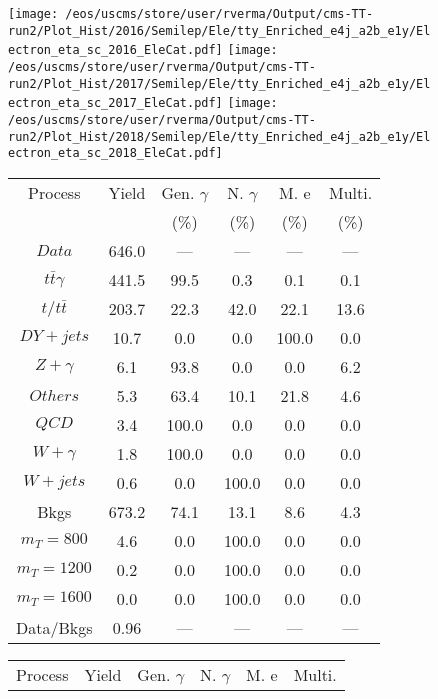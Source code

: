 \begin{figure}
\centering
\texttt{[image: /eos/uscms/store/user/rverma/Output/cms-TT-run2/Plot\_Hist/2016/Semilep/Ele/tty\_Enriched\_e4j\_a2b\_e1y/Electron\_eta\_sc\_2016\_EleCat.pdf]}
\texttt{[image: /eos/uscms/store/user/rverma/Output/cms-TT-run2/Plot\_Hist/2017/Semilep/Ele/tty\_Enriched\_e4j\_a2b\_e1y/Electron\_eta\_sc\_2017\_EleCat.pdf]}
\texttt{[image: /eos/uscms/store/user/rverma/Output/cms-TT-run2/Plot\_Hist/2018/Semilep/Ele/tty\_Enriched\_e4j\_a2b\_e1y/Electron\_eta\_sc\_2018\_EleCat.pdf]}
\begin{minipage}[c]{0.32\textwidth}
\centering
\tiny{
\begin{tabular}{cccccc}
\hline
Process & Yield & Gen. $\gamma$ & N. $\gamma$ & M. e & Multi. \\
 &  & (\%) & (\%) & (\%) & (\%)  \\
\hline
                                                                      $ Data $ &  646.0 &  --- &  --- &  --- &  ---\\
$ t\bar{t}\gamma $ &  441.5 &  99.5 &  0.3 &  0.1 &  0.1\\
$ t/t\bar{t} $ &  203.7 &  22.3 &  42.0 &  22.1 &  13.6\\
$ DY+jets $ &  10.7 &  0.0 &  0.0 &  100.0 &  0.0\\
$ Z+\gamma $ &  6.1 &  93.8 &  0.0 &  0.0 &  6.2\\
$ Others $ &  5.3 &  63.4 &  10.1 &  21.8 &  4.6\\
$ QCD $ &  3.4 &  100.0 &  0.0 &  0.0 &  0.0\\
$ W+\gamma $ &  1.8 &  100.0 &  0.0 &  0.0 &  0.0\\
$ W+jets $ &  0.6 &  0.0 &  100.0 &  0.0 &  0.0\\
Bkgs &  673.2 &  74.1 &  13.1 &  8.6 &  4.3\\
$ m_{T} = 800 $ &  4.6 &  0.0 &  100.0 &  0.0 &  0.0\\
$ m_{T} = 1200 $ &  0.2 &  0.0 &  100.0 &  0.0 &  0.0\\
$ m_{T} = 1600 $ &  0.0 &  0.0 &  100.0 &  0.0 &  0.0\\
Data/Bkgs &  0.96 &  --- &  --- &  --- &  ---\\
\hline
\end{tabular}
}
\end{minipage}
\begin{minipage}[c]{0.32\textwidth}
\centering
\tiny{
\begin{tabular}{cccccc}
\hline
Process & Yield & Gen. $\gamma$ & N. $\gamma$ & M. e & Multi. \\

\end{tabular}}
\end{minipage}
\end{figure}
